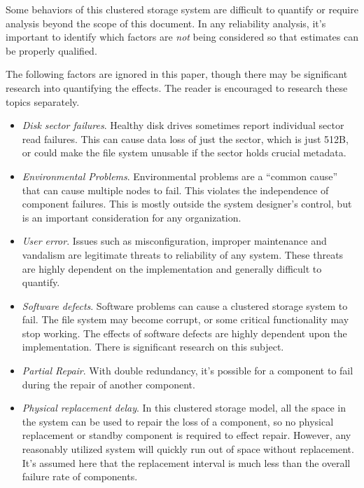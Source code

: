 \documentclass[11pt]{article}
\numberwithin{equation}{section}
\begin{document}
Some behaviors of this clustered storage system are difficult to quantify or
require analysis beyond the scope of this document.  In any reliability
analysis, it's important to identify which factors are {\em not} being
considered so that estimates can be properly qualified. 

The following factors are ignored in this paper, though there may be
significant research into quantifying the effects.  The reader is encouraged
to research these topics separately.

\begin{itemize}
    \item {\em Disk sector failures}.
    Healthy disk drives sometimes report individual sector read failures.
    This can cause data loss of just the sector, which is just 512B, or could
    make the file system unusable if the sector holds crucial metadata.

    \item {\em Environmental Problems}.
    Environmental problems are a ``common cause'' that can cause multiple
    nodes to fail.  This violates the independence of component failures.
    This is mostly outside the system designer's control, but is an important
    consideration for any organization.

    \item {\em User error}.
    Issues such as misconfiguration, improper maintenance and vandalism are
    legitimate threats to reliability of any system.  These threats are highly
    dependent on the implementation and generally difficult to quantify.

    \item {\em Software defects}.
    Software problems can cause a clustered storage system to fail.  The file
    system may become corrupt, or some critical functionality may stop
    working.  The effects of software defects are highly dependent upon the
    implementation.  There is significant research on this subject.  

    \item {\em Partial Repair}.
    With double redundancy, it's possible for a component to fail during the
    repair of another component.

    \item {\em Physical replacement delay}.
    In this clustered storage model, all the space in the system can be used
    to repair the loss of a component, so no physical replacement or standby
    component is required to effect repair.  However, any reasonably utilized
    system will quickly run out of space without replacement.  It's assumed
    here that the replacement interval is much less than the overall failure
    rate of components.
\end{itemize}
\end{document}

